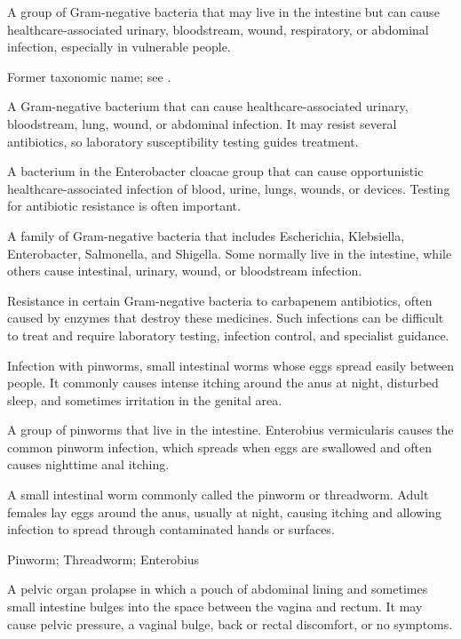  A group of Gram-negative bacteria that may live in the intestine but can cause healthcare-associated urinary, bloodstream, wound, respiratory, or abdominal infection, especially in vulnerable people.

 Former taxonomic name; see .

 A Gram-negative bacterium that can cause healthcare-associated urinary, bloodstream, lung, wound, or abdominal infection. It may resist several antibiotics, so laboratory susceptibility testing guides treatment.

 A bacterium in the Enterobacter cloacae group that can cause opportunistic healthcare-associated infection of blood, urine, lungs, wounds, or devices. Testing for antibiotic resistance is often important.

 A family of Gram-negative bacteria that includes Escherichia, Klebsiella, Enterobacter, Salmonella, and Shigella. Some normally live in the intestine, while others cause intestinal, urinary, wound, or bloodstream infection.

 Resistance in certain Gram-negative bacteria to carbapenem antibiotics, often caused by enzymes that destroy these medicines. Such infections can be difficult to treat and require laboratory testing, infection control, and specialist guidance.

 Infection with pinworms, small intestinal worms whose eggs spread easily between people. It commonly causes intense itching around the anus at night, disturbed sleep, and sometimes irritation in the genital area.

 A group of pinworms that live in the intestine. Enterobius vermicularis causes the common pinworm infection, which spreads when eggs are swallowed and often causes nighttime anal itching.

 A small intestinal worm commonly called the pinworm or threadworm. Adult females lay eggs around the anus, usually at night, causing itching and allowing infection to spread through contaminated hands or surfaces.

\synonyms
Pinworm; Threadworm; Enterobius

 A pelvic organ prolapse in which a pouch of abdominal lining and sometimes small intestine bulges into the space between the vagina and rectum. It may cause pelvic pressure, a vaginal bulge, back or rectal discomfort, or no symptoms.

